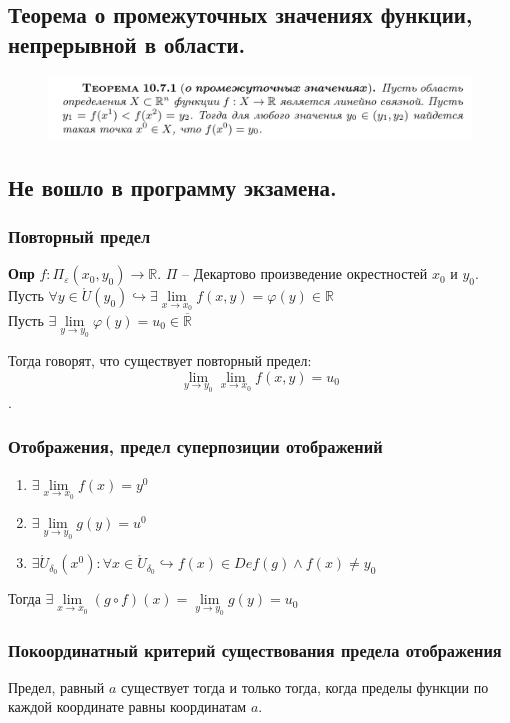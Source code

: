 \documentclass{article}
\newcommand{\R}{\mathbb{R}}
\newcommand{\bb}{\textbf}
\begin{document}
\subsection{Теорема о промежуточных значениях функции, непрерывной в области.}
\begin{figure}[h!]
    \centering
    \includegraphics[width=\textwidth]{49.png}
    \vspace{-1cm}
\end{figure}
\newpage
\subsection{Не вошло в программу экзамена.}
\subsubsection{Повторный предел}
\bb{Опр} $f: \Pi_\varepsilon(x_0, y_0) \to \R $. $\Pi$ -- Декартово произведение окрестностей $x_0$ и $y_0$. \\
Пусть $\forall y \in \mathring{U}(y_0)\hookrightarrow \exists \lim\limits_{x\to x_0}f(x,y) = \varphi(y) \in \R$\\
Пусть $\exists \lim\limits_{y\to y_0} \varphi(y) = u_0 \in \overline{\R}$

Тогда говорят, что существует повторный предел:
$$\lim\limits_{y\to y_0}\lim\limits_{x\to x_0} f(x,y) = u_0$$.
\subsubsection{Отображения, предел суперпозиции отображений}
\begin{enumerate}
    \item $\exists \lim\limits_{x\to x_0}f(x) = y^0$
    \item $\exists \lim\limits_{y\to y_0}g(y) = u^0$
    \item $\exists \mathring{U}_{\delta_0}(x^0): \forall x \in \mathring{U}_{\delta_0}\hookrightarrow f(x) \in Def(g) \land f(x) \neq y_0$
\end{enumerate}
Тогда $\exists \lim\limits_{x\to x_0}(g\circ f)(x) = \lim\limits_{y\to y_0}g(y) = u_0$

\subsubsection{Покоординатный критерий существования предела отображения}
Предел, равный $a$ существует тогда и только тогда, когда пределы функции по каждой координате равны координатам $a$.
\end{document}
